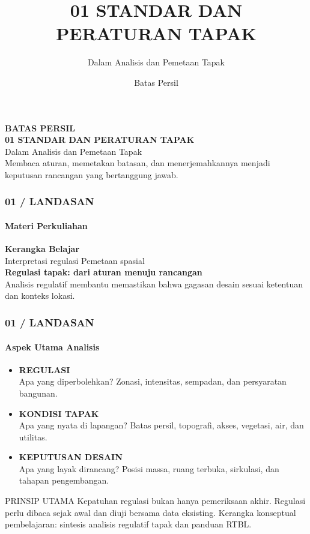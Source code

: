 \documentclass[../main.tex]{subfiles}
\title{01 STANDAR DAN PERATURAN TAPAK}
\subtitle{Dalam Analisis dan Pemetaan Tapak}
\author{Batas Persil}
\date{}
\begin{document}
\begin{frame}[mytitle=center,c,mycolor=digiPH_ocean]
	\color{white}
	\begin{center}
		\Huge \textbf{BATAS PERSIL}\\[0.5cm]
		\Large \textbf{01 STANDAR DAN PERATURAN TAPAK}\\
		\large Dalam Analisis dan Pemetaan Tapak\\[1cm]
		\normalsize Membaca aturan, memetakan batasan, dan menerjemahkannya menjadi keputusan rancangan yang bertanggung jawab.
	\end{center}
\end{frame}

\begin{frame}[mytitle=standard,t]
	\frametitle{01 / LANDASAN}
	\framesubtitle{Materi Perkuliahan}

	\textbf{Kerangka Belajar}\\
	Interpretasi regulasi \textbullet{} Pemetaan spasial\\[1em]

	\textbf{Regulasi tapak: dari aturan menuju rancangan}\\
	Analisis regulatif membantu memastikan bahwa gagasan desain sesuai ketentuan dan konteks lokasi.
\end{frame}

\begin{frame}[mytitle=standard,t,mycolor=digiPH_gray!20]
	\frametitle{01 / LANDASAN}
	\framesubtitle{Aspek Utama Analisis}

	\begin{itemize}
		\item \textbf{REGULASI}\\
		      Apa yang diperbolehkan? Zonasi, intensitas, sempadan, dan persyaratan bangunan.

		\item \textbf{KONDISI TAPAK}\\
		      Apa yang nyata di lapangan? Batas persil, topografi, akses, vegetasi, air, dan utilitas.

		\item \textbf{KEPUTUSAN DESAIN}\\
		      Apa yang layak dirancang? Posisi massa, ruang terbuka, sirkulasi, dan tahapan pengembangan.
	\end{itemize}

	\begin{block}{PRINSIP UTAMA}
		Kepatuhan regulasi bukan hanya pemeriksaan akhir. Regulasi perlu dibaca sejak awal dan diuji bersama data eksisting. Kerangka konseptual pembelajaran: sintesis analisis regulatif tapak dan panduan RTBL.
	\end{block}
\end{frame}
\end{document}

